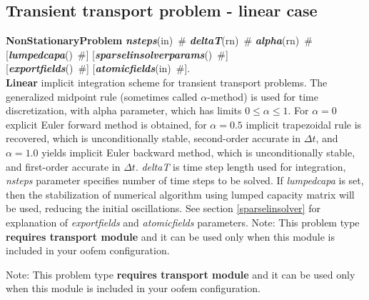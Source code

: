 \documentclass[draft]{article}
\newcommand{\param}[1]{{\em #1}}
\newcommand{\keywordnotype}[1]{\mbox{{\it{\bf{#1}}}}}
\newcommand{\keyword}[2]{\mbox{{\keywordnotype{#1}\tiny (#2)}}}
\newcommand{\entKeywordInst}[1]{\mbox{{\bf{{#1}}}}}
\newcommand{\field}[2]{\mbox{\keyword{#1}{#2}~\#}}
\newcommand{\optField}[2]{\mbox{[\field{#1}{#2}]}}
\begin{document}
\subsection{Transient transport problem - linear case}
\label{LinearTransientTransport}
\entKeywordInst{NonStationaryProblem} \field{nsteps}{in}
\field{deltaT}{rn} \field{alpha}{rn}\\ \optField{lumpedcapa}{}
\optField{sparselinsolverparams}{}\\
\optField{exportfields}{} \optField{atomicfields}{in}.\\
{\bf Linear} implicit
integration scheme for transient transport problems. The generalized
midpoint rule (sometimes called $\alpha$-method) is used for time discretization, with alpha parameter,
which has limits $0\le\alpha\le1$. For $\alpha=0$ explicit Euler
forward method is obtained, for $\alpha=0.5$ implicit trapezoidal rule
is recovered, which is unconditionally stable, second-order accurate
in $\Delta t$, and $\alpha=1.0$ yields implicit Euler backward method,
which is unconditionally stable, and first-order accurate
in $\Delta t$. \param{deltaT} is time step length used for
integration, \param{nsteps} parameter specifies
number of time steps to be solved.
If \param{lumpedcapa} is set, then the stabilization of numerical
algorithm using lumped capacity matrix will be used, reducing the
initial oscillations.
See section \ref{sparselinsolver} for explanation of
\param{exportfields} and \param{atomicfields} parameters.
Note: This problem type {\bf requires transport module} and it
can be used only when this module is included in your oofem
configuration.

Note: This problem type {\bf requires transport module} and it
can be used only when this module is included in your oofem
configuration.
\end{document}
